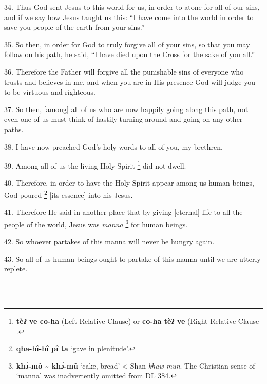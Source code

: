 34. Thus God sent Jesus to this world for us, in order to atone for all of our
sins, and if we say how Jesus taught us this: ``I have come into the world in order
to save you people of the earth from your sins.''

35. So then, in order for God to truly forgive all of your sins, so that you may
follow on his path, he said, ``I have died upon the Cross for the sake of you all.''

36. Therefore the Father will forgive all the punishable sins of everyone who trusts
and believes in me, and when you are in His presence God will judge you to be virtuous
and righteous.

37. So then, [among] all of us who are now happily going along this path, not even
one of us must think of hastily turning around and going on any other paths.

38. I have now preached God's holy words to all of you, my brethren.

39. Among all of us the living Holy Spirit \footnote{\textbf{tèʔ ve co-ha } (Left Relative Clause) or\textbf{ co-ha  tèʔ ve }(Right Relative Clause\textbf{ }.} did not dwell.

40. Therefore, in order to have the Holy Spirit appear among us human beings, God
poured \footnote{\textbf{qha-bî-bî pî tā} `gave in plenitude'.} [its essence] into his Jesus.

41. Therefore He said in another place  that by giving [eternal] life to all the
people of the world, Jesus was \textit{manna }\footnote{\textbf{khɔ̀-mô \textasciitilde{} khɔ̀-mû }`cake, bread' < Shan \textit{khaw-mun}. The Christian sense of `manna' was inadvertently omitted from DL 384.} for human beings.

42. So whoever partakes of this manna will never be hungry again.

43. So all of us human beings ought to partake of this manna until we are utterly
replete.

----------------------------------------------------------------------------------------------------------------------------------------------------

